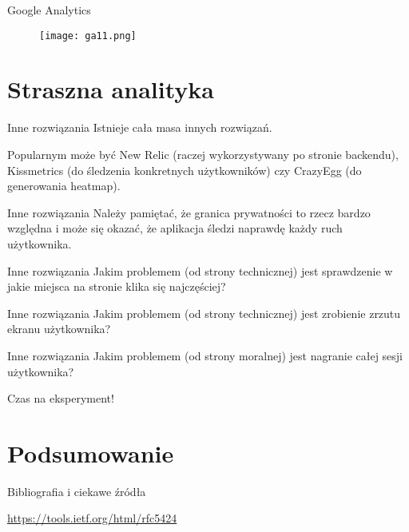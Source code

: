 \begin{frame}{Google Analytics}
	\begin{figure}[t]
		\centering
		\texttt{[image: ga11.png]}
	\end{figure}
\end{frame}

\section{Straszna analityka}

\begin{frame}{Inne rozwiązania}
	Istnieje cała masa innych rozwiązań. 
	
	Popularnym może być New Relic (raczej wykorzystywany po stronie backendu), Kissmetrics (do śledzenia konkretnych użytkowników) czy CrazyEgg (do generowania heatmap).
\end{frame}

\begin{frame}{Inne rozwiązania}
	Należy pamiętać, że granica prywatności to rzecz bardzo względna i może się okazać, że aplikacja śledzi naprawdę każdy ruch użytkownika.
\end{frame}

\begin{frame}{Inne rozwiązania}
	Jakim problemem (od strony technicznej) jest sprawdzenie w jakie miejsca na stronie klika się najczęściej?
\end{frame}

\begin{frame}{Inne rozwiązania}
	Jakim problemem (od strony technicznej) jest zrobienie zrzutu ekranu użytkownika?
\end{frame}

\begin{frame}{Inne rozwiązania}
	Jakim problemem (od strony moralnej) jest nagranie całej sesji użytkownika?
\end{frame}

\begin{frame}[standout]
	Czas na eksperyment!
\end{frame}

\section{Podsumowanie}

\begin{frame}{Bibliografia i ciekawe źródła}
  
	\begin{thebibliography}{9}
		
		\url{https://tools.ietf.org/html/rfc5424}
	
	\end{thebibliography}

\end{frame}

